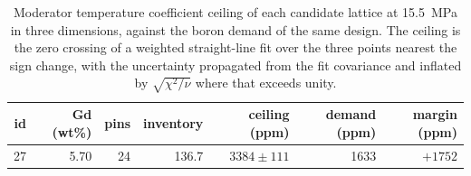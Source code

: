 \begin{table}[htbp]
  \centering
  \caption[Boron ceiling of each candidate lattice]{Moderator temperature coefficient ceiling of each candidate lattice at \SI{15.5}{MPa} in three dimensions, against the boron demand of the same design. The ceiling is the zero crossing of a weighted straight-line fit over the three points nearest the sign change, with the uncertainty propagated from the fit covariance and inflated by $\sqrt{\chi^2/\nu}$ where that exceeds unity.}
  \label{tab:c9-ceilings}
  \begin{tabular}{rrrrrrr}
    \toprule
    id & Gd (wt\%) & pins & inventory & ceiling (ppm) & demand (ppm) & margin (ppm) \\
    \midrule
    27 & 5.70 & 24 & 136.7 & $3384 \pm 111$ & 1633 & $+1752$ \\
    \bottomrule
  \end{tabular}
\end{table}
